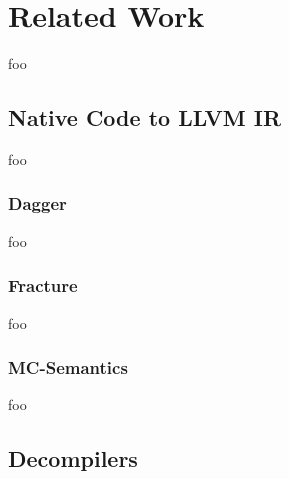 
\section{Related Work}

foo


\subsection{Native Code to LLVM IR}


foo


\subsubsection{Dagger}

foo


\subsubsection{Fracture}

foo


\subsubsection{MC-Semantics}


foo


\subsection{Decompilers}

